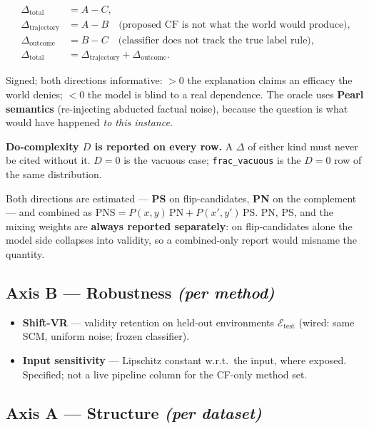 \documentclass[11pt]{article}
\newcommand{\Etest}{\mathcal{E}_{\text{test}}}
\newcommand{\Deltatotal}{\Delta_{\mathrm{total}}}
\newcommand{\Deltatraj}{\Delta_{\mathrm{trajectory}}}
\newcommand{\Deltaout}{\Delta_{\mathrm{outcome}}}
\begin{document}
\begin{align}
  \Deltatotal      &= A - C, \\
  \Deltatraj       &= A - B
    \quad\text{(proposed CF is not what the world would produce),} \\
  \Deltaout        &= B - C
    \quad\text{(classifier does not track the true label rule),} \\
  \Deltatotal      &= \Deltatraj + \Deltaout.
\end{align}

Signed; both directions informative: $> 0$ the explanation claims an
efficacy the world denies; $< 0$ the model is blind to a real dependence.
The oracle uses \textbf{Pearl semantics} (re-injecting abducted factual
noise), because the question is what would have happened \emph{to this
instance}.

\textbf{Do-complexity $D$ is reported on every row.} A $\Delta$ of either
kind must never be cited without it. $D = 0$ is the vacuous case;
\texttt{frac\_vacuous} is the $D = 0$ row of the same distribution.

Both directions are estimated --- \textbf{PS} on flip-candidates,
\textbf{PN} on the complement --- and combined as
$\mathrm{PNS} = P(x,y)\,\mathrm{PN} + P(x',y')\,\mathrm{PS}$.
PN, PS, and the mixing weights are \textbf{always reported separately}:
on flip-candidates alone the model side collapses into validity, so a
combined-only report would misname the quantity.

\subsection{Axis B --- Robustness \emph{(per method)}}

\begin{itemize}[leftmargin=*]
  \item \textbf{Shift-VR} --- validity retention on held-out environments
        $\Etest$ (wired: same SCM, uniform noise; frozen classifier).
  \item \textbf{Input sensitivity} --- Lipschitz constant w.r.t.\ the
        input, where exposed. Specified; not a live pipeline column for
        the CF-only method set.
\end{itemize}

\subsection{Axis A --- Structure \emph{(per dataset)}}
\end{document}
